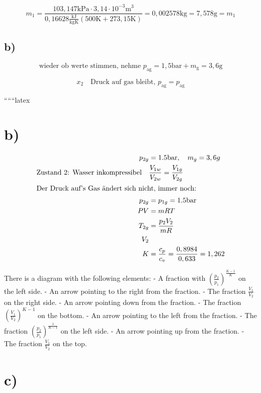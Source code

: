 \[
m_1 = \frac{103,147 \text{kPa} \cdot 3,14 \cdot 10^{-3} \text{m}^3}{0,16628 \frac{\text{kJ}}{\text{kgK}} (500 \text{K} + 273,15 \text{K})} = 0,002578 \text{kg} = 7,578 \text{g} = m_1
\]

\subsection*{b)}

\[
\text{wieder ob werte stimmen, nehme } p_{\text{ag}} = 1,5 \text{bar} + m_{\text{g}} = 3,6 \text{g}
\]

\[
x_2 \quad \text{Druck auf gas bleibt, } p_{\text{ag}} = p_{\text{ag}}
\]

``````latex


\section*{b)}

\begin{align*}
    p_{2g} &= 1.5 \text{bar}, \quad m_g = 3,6g \\
    \text{Zustand 2: Wasser inkompressibel} \quad & \frac{V_{1w}}{V_{2w}} = \frac{V_{1g}}{V_{2g}} \\
    \intertext{Der Druck auf's Gas ändert sich nicht, immer noch:}
    p_{2g} &= p_{1g} = 1.5 \text{bar} \\
    PV &= mRT \\
    T_{2g} &= \frac{p_{2} V_{2}}{mR} \\
    V_{2} \\
    K &= \frac{c_p}{c_v} = \frac{0,8984}{0,633} = 1,262
\end{align*}

\noindent
There is a diagram with the following elements:
- A fraction with \(\left(\frac{p_2}{p_1}\right)^{\frac{K-1}{K}}\) on the left side.
- An arrow pointing to the right from the fraction.
- The fraction \(\frac{V_1}{V_2}\) on the right side.
- An arrow pointing down from the fraction.
- The fraction \(\left(\frac{V_1}{V_2}\right)^{K-1}\) on the bottom.
- An arrow pointing to the left from the fraction.
- The fraction \(\left(\frac{p_2}{p_1}\right)^{\frac{1}{K-1}}\) on the left side.
- An arrow pointing up from the fraction.
- The fraction \(\frac{V_1}{V_2}\) on the top.

\section*{c)}

